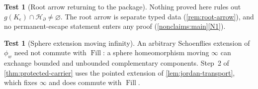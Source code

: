 \documentclass[11pt,reqno]{amsart}
\numberwithin{equation}{section}
\theoremstyle{plain}
\theoremstyle{definition}
\newtheorem{test}[theorem]{Test}
\theoremstyle{remark}
\DeclareMathOperator{\Fill}{Fill}
\newcommand{\HB}{\mathcal H_\partial}
\newcommand{\rootK}{K_{\epsilon}}
\begin{document}
\begin{test}[Root arrow returning to the package]
\label{test:root-return}
Nothing proved here rules out
$g(\rootK)\cap\HB\ne\varnothing$.  The root arrow is separate typed
data (\cref{rem:root-arrow}), and no permanent-escape statement enters
any proof (\cref{nonclaims:main}\ref{N1}).
\end{test}

\begin{test}[Sphere extension moving infinity]
\label{test:pointed}
An arbitrary Schoenflies extension of $\phi_w$ need not commute with
$\Fill$: a sphere homeomorphism moving $\infty$ can exchange bounded
and unbounded complementary components.  Step~2 of
\cref{thm:protected-carrier} uses the pointed extension of
\cref{lem:jordan-transport}, which fixes $\infty$ and does commute
with $\Fill$.
\end{test}
\end{document}
